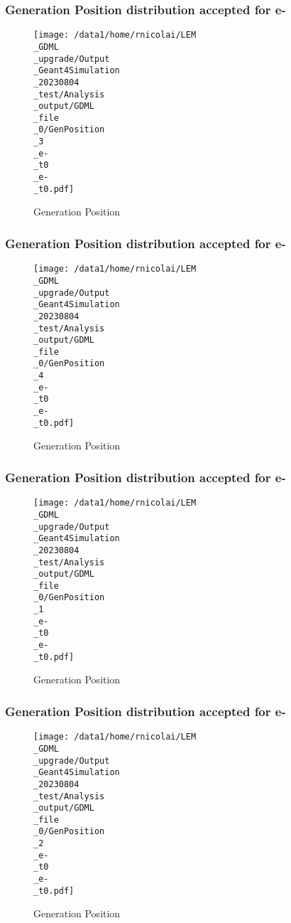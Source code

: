 \documentclass[8pt]{beamer}
\begin{document}
            \begin{frame}
                \frametitle{Generation Position distribution accepted for e-}
            
        \begin{figure}[h]
            \centering
            \texttt{[image: /data1/home/rnicolai/LEM\\\_GDML\\\_upgrade/Output\\\_Geant4Simulation\\\_20230804\\\_test/Analysis\\\_output/GDML\\\_file\\\_0/GenPosition\\\_3\\\_e-\\\_t0\\\_e-\\\_t0.pdf]}
            \caption{Generation Position}
        \end{figure}
        
            \end{frame}
            
            \begin{frame}
                \frametitle{Generation Position distribution accepted for e-}
            
        \begin{figure}[h]
            \centering
            \texttt{[image: /data1/home/rnicolai/LEM\\\_GDML\\\_upgrade/Output\\\_Geant4Simulation\\\_20230804\\\_test/Analysis\\\_output/GDML\\\_file\\\_0/GenPosition\\\_4\\\_e-\\\_t0\\\_e-\\\_t0.pdf]}
            \caption{Generation Position}
        \end{figure}
        
            \end{frame}
            
            \begin{frame}
                \frametitle{Generation Position distribution accepted for e-}
            
        \begin{figure}[h]
            \centering
            \texttt{[image: /data1/home/rnicolai/LEM\\\_GDML\\\_upgrade/Output\\\_Geant4Simulation\\\_20230804\\\_test/Analysis\\\_output/GDML\\\_file\\\_0/GenPosition\\\_1\\\_e-\\\_t0\\\_e-\\\_t0.pdf]}
            \caption{Generation Position}
        \end{figure}
        
            \end{frame}
            
            \begin{frame}
                \frametitle{Generation Position distribution accepted for e-}
            
        \begin{figure}[h]
            \centering
            \texttt{[image: /data1/home/rnicolai/LEM\\\_GDML\\\_upgrade/Output\\\_Geant4Simulation\\\_20230804\\\_test/Analysis\\\_output/GDML\\\_file\\\_0/GenPosition\\\_2\\\_e-\\\_t0\\\_e-\\\_t0.pdf]}
            \caption{Generation Position}
        \end{figure}
        
            \end{frame}
            
\end{document}
